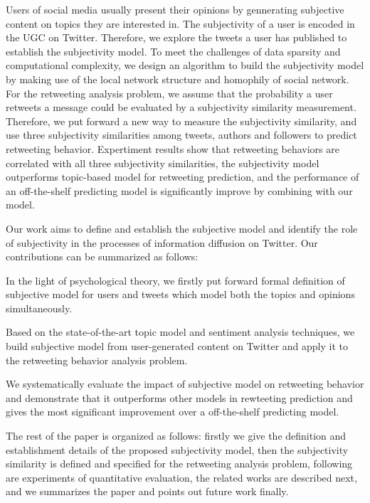 \documentclass{acm_proc_article-sp}
\begin{document}
Users of social media usually present their opinions by gennerating subjective content on topics they are interested in. 
The subjectivity of a user is encoded in the UGC on Twitter. 
Therefore, we explore the tweets a user has published to establish the subjectivity model. 
To meet the challenges of data sparsity and computational complexity, we design an algorithm to build the subjectivity model by making use of the local network structure and homophily of social network. 
For the retweeting analysis problem, we assume that the probability a user retweets a message could be evaluated by a subjectivity similarity measurement. 
Therefore, we put forward a new way to measure the subjectivity similarity, and use three subjectivity similarities among tweets, authors and followers to predict retweeting behavior. 
Expertiment results show that retweeting behaviors are correlated with all three subjectivity similarities, the subjectivity model outperforms topic-based model for retweeting prediction, and the performance of an off-the-shelf predicting model is significantly improve by combining with our model. 

Our work aims to define and establish the subjective model and identify the role of subjectivity in the processes of information diffusion on Twitter. Our contributions can be summarized as follows:
\begin{itemize*}
\item In the light of psychological theory, we firstly put forward formal definition of subjective model for users and tweets which model both the topics and opinions simultaneously.
\item Based on the state-of-the-art topic model and sentiment analysis techniques, we build subjective model from user-generated content on Twitter and apply it to the retweeting behavior analysis problem.
\item We systematically evaluate the impact of subjective model on retweeting behavior and demonstrate that it outperforms other models in rewteeting prediction and gives the most significant improvement over a off-the-shelf predicting model. 
\end{itemize*}
The rest of the paper is organized as follows: firstly we give the definition and establishment details of the proposed subjectivity model, then the subjectivity similarity is defined and specified for the retweeting analysis problem, following are experiments of quantitative evaluation, the related works are described next, and we summarizes the paper and points out future work finally.
\end{document}
